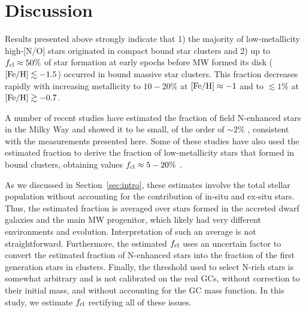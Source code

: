 \documentclass[a4paper,useAMS,usenatbib]{mnras}
\begin{document}
\section{Discussion}
\label{sec:discussion}

Results presented above strongly indicate that 1) the majority of low-metallicity high-[N/O] stars originated in compact bound star clusters and 2) up to $f_{\rm cl}\approx 50\%$ of star formation at early epochs before MW formed its disk (${\rm [Fe/H]}\lesssim -1.5$) occurred in bound massive star clusters. This fraction decreases rapidly with increasing metallicity to $10-20\%$ at ${\rm [Fe/H]}\approx -1$ and to $\lesssim 1\%$ at ${\rm [Fe/H]}\gtrsim -0.7$.

A number of recent studies have estimated the fraction of field N-enhanced stars in the Milky Way and showed it to be small, of the order of $\sim2\%$ \citep[e.g.,][]{Martell2016, Schiavon2017, Koch2019, Horta2021}, consistent with the measurements presented here. Some of these studies 
have also used the estimated fraction to derive the fraction of low-metallicity stars that formed in bound clusters, obtaining values $f_{\rm cl}\approx 5-20\%$  \citep[e.g.,][]{Martell2011,Koch2019,Horta2021}. 

As we discussed in Section~\ref{sec:intro}, these estimates involve the total stellar population without accounting for the contribution of in-situ and ex-situ stars. Thus, the estimated fraction is averaged over stars formed in the accreted dwarf galaxies and the main MW progenitor, which likely had very different environments and evolution. Interpretation of such an average is not straightforward. Furthermore, the estimated $f_{\rm cl}$ uses an uncertain factor to convert the estimated fraction of N-enhanced stars into the fraction of the first generation stars in clusters. Finally, the threshold used to select N-rich stars is somewhat arbitrary and is not calibrated on the real GCs, without correction to their initial mass, and without accounting for the GC mass function. In this study, we estimate $f_{\rm cl}$ rectifying all of these issues.  
\end{document}
